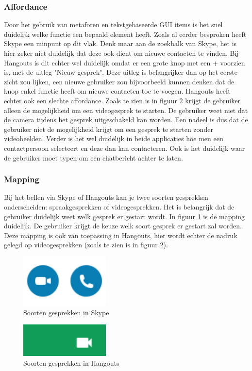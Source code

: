 \documentclass[11pt]{article}
\begin{document}
\subsubsection{Affordance}
Door het gebruik van metaforen en tekstgebaseerde GUI items is het snel duidelijk welke functie een bepaald element heeft. Zoals al eerder besproken heeft Skype een minpunt op dit vlak. Denk maar aan de zoekbalk van Skype, het is hier zeker niet duidelijk dat deze ook dient om nieuwe contacten te vinden. Bij Hangouts is dit echter wel duidelijk omdat er een grote knop met een + voorzien is, met de uitleg "Nieuw gesprek". Deze uitleg is belangrijker dan op het eerste zicht zou lijken, een nieuwe gebruiker zou bijvoorbeeld kunnen denken dat de knop enkel functie heeft om nieuwe contacten toe te voegen.
\newline
Hangouts heeft echter ook een slechte affordance. Zoals te zien is in figuur \ref{fig:SoortHangouts} krijgt de gebruiker alleen de mogelijkheid om een videogesprek te starten. De gebruiker weet niet dat de camera tijdens het gesprek uitgeschakeld kan worden. Een nadeel is dus dat de gebruiker niet de mogelijkheid krijgt om een gesprek te starten zonder videobeelden.
\newline
 Verder is het wel duidelijk in beide applicaties hoe men een contactpersoon selecteert en deze dan kan contacteren. Ook is het duidelijk waar de gebruiker moet typen om een chatbericht achter te laten.
 \subsubsection{Mapping}
 Bij het bellen via Skype of Hangouts kan je twee soorten gesprekken onderscheiden: spraakgesprekken of videogesprekken. Het is belangrijk dat de gebruiker duidelijk weet welk gesprek er gestart wordt. In figuur \ref{fig:SoortSkype} is de mapping duidelijk. De gebruiker krijgt de keuze welk soort gesprek er gestart zal worden. Deze mapping is ook van toepassing in Hangouts, hier wordt echter de nadruk gelegd op videogesprekken (zoals te zien is in figuur \ref{fig:SoortHangouts}).
 \begin{figure}
	\centering
	\includegraphics[width=0.4\textwidth]{Bram_ScreenshotSkype3.png}
	\caption{Soorten gesprekken in Skype}
	\label{fig:SoortSkype}
\end{figure}
\begin{figure}
	\centering
	\includegraphics[width=0.4\textwidth]{Bram_ScreenshotGH3.png}
	\caption{Soorten gesprekken in Hangouts}
	\label{fig:SoortHangouts}
\end{figure}
\end{document}

